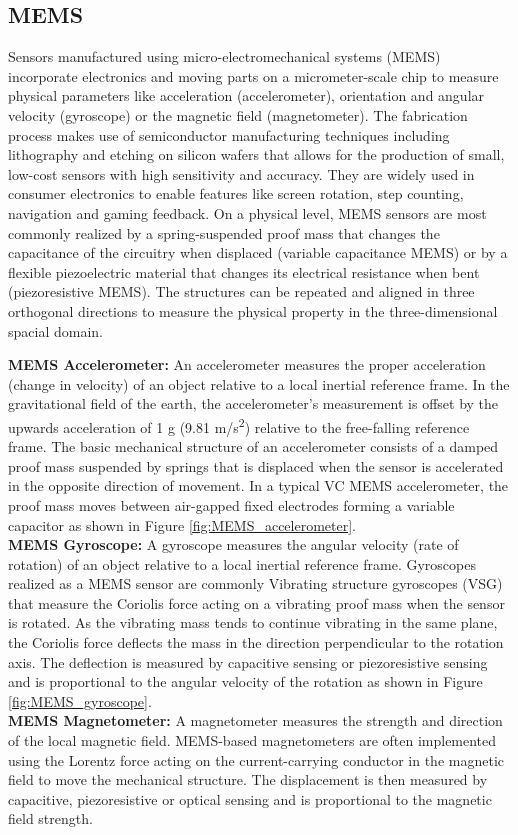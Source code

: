 \documentclass[sigconf, nonacm]{acmart}
\begin{document}
\subsection{MEMS}
\begin{sloppypar}
  Sensors manufactured using micro-electromechanical systems (MEMS) incorporate electronics and moving parts on a micrometer-scale chip to measure physical parameters like acceleration (accelerometer), orientation and angular velocity (gyroscope) or the magnetic field (magnetometer).
  The fabrication process makes use of semiconductor manufacturing techniques including lithography and etching on silicon wafers that allows for the production of small, low-cost sensors with high sensitivity and accuracy.
  They are widely used in consumer electronics to enable features like screen rotation, step counting, navigation and gaming feedback.
  On a physical level, MEMS sensors are most commonly realized by a spring-suspended proof mass that changes the capacitance of the circuitry when displaced (variable capacitance MEMS) or by a flexible piezoelectric material that changes its electrical resistance when bent (piezoresistive MEMS).
  The structures can be repeated and aligned in three orthogonal directions to measure the physical property in the three-dimensional spacial domain.
  \vspace{0.25cm}
\end{sloppypar}
\noindent
\textbf{MEMS Accelerometer:} An accelerometer measures the proper acceleration (change in velocity) of an object relative to a local inertial reference frame.
In the gravitational field of the earth, the accelerometer's measurement is offset by the upwards acceleration of 1 g (9.81 m/s\textsuperscript{2}) relative to the free-falling reference frame.
The basic mechanical structure of an accelerometer consists of a damped proof mass suspended by springs that is displaced when the sensor is accelerated in the opposite direction of movement.
In a typical VC MEMS accelerometer, the proof mass moves between air-gapped fixed electrodes forming a variable capacitor as shown in Figure \ref{fig:MEMS_accelerometer}.
\\[6pt]
\textbf{MEMS Gyroscope:} A gyroscope measures the angular velocity (rate of rotation) of an object relative to a local inertial reference frame.
Gyroscopes realized as a MEMS sensor are commonly Vibrating structure gyroscopes (VSG) that measure the Coriolis force acting on a vibrating proof mass when the sensor is rotated.
As the vibrating mass tends to continue vibrating in the same plane, the Coriolis force deflects the mass in the direction perpendicular to the rotation axis.
The deflection is measured by capacitive sensing or piezoresistive sensing and is proportional to the angular velocity of the rotation as shown in Figure \ref{fig:MEMS_gyroscope}.
\\[6pt]
\textbf{MEMS Magnetometer:} A magnetometer measures the strength and direction of the local magnetic field.
MEMS-based magnetometers are often implemented using the Lorentz force acting on the current-carrying conductor in the magnetic field to move the mechanical structure.
The displacement is then measured by capacitive, piezoresistive or optical sensing and is proportional to the magnetic field strength.
\end{document}
